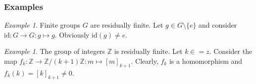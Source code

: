 \documentclass[titlepage, a4paper]{article}
\newcommand{\id}{\mathrm{id}}
\theoremstyle{remark}
\newtheorem{example}[theorem]{Example}
\begin{document}
\subsubsection{Examples}

\begin{example}
	Finite groups $G$ are residually finite. Let $g \in G \setminus \{e\}$ and consider $\id: G \to G: g \mapsto g$. Obviously $\id(g) \neq e$.
\end{example}


\begin{example}
	The group of integers $\mathbb Z$ is residually finite. Let $k \in \mathbb =z$. Consider the map $f_k: \mathbb Z \to \mathbb Z/(k+1)\mathbb Z: m \mapsto [m]_{k+1}$. Clearly, $f_k$ is a homomorphism and $f_k(k) = [k]_{k+1} \neq 0$.
\end{example}
\end{document}

